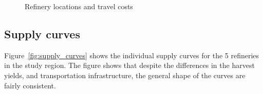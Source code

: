 \documentclass{elsart}
\begin{document}
\begin{figure}[hpt]
  \centering
    \caption{Refinery locations and travel costs}
    \label{fig:dest-travel}
\end{figure}


\subsection{Supply curves}

Figure~\ref{fig:supply_curves} shows the individual supply curves for
the 5 refineries in the study region.  The figure shows that despite
the differences in the harvest yields, and transportation
infrastructure, the general shape of the curves are fairly
consistent.
\end{document}
